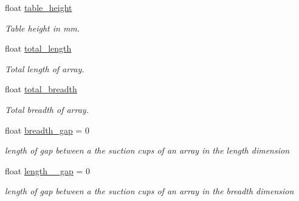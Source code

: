 \begin{DoxyCompactItemize}
\mbox{\label{classSuctionCupArray_a52078f120d8a964f00870e49253a5630}} 
float \hyperlink{classSuctionCupArray_a52078f120d8a964f00870e49253a5630}{table\+\_\+height}
\begin{DoxyCompactList}\small\item\em Table height in mm. \end{DoxyCompactList}\item 
\mbox{\label{classSuctionCupArray_aa9aedb708c91f8cccd83cdcf09437a44}} 
float \hyperlink{classSuctionCupArray_aa9aedb708c91f8cccd83cdcf09437a44}{total\+\_\+length}
\begin{DoxyCompactList}\small\item\em Total length of array. \end{DoxyCompactList}\item 
\mbox{\label{classSuctionCupArray_aa824e15826e6aa1f860475daec41e17e}} 
float \hyperlink{classSuctionCupArray_aa824e15826e6aa1f860475daec41e17e}{total\+\_\+breadth}
\begin{DoxyCompactList}\small\item\em Total breadth of array. \end{DoxyCompactList}\item 
\mbox{\label{classSuctionCupArray_abc9fedf81d8e05ce102a65773e070255}} 
float \hyperlink{classSuctionCupArray_abc9fedf81d8e05ce102a65773e070255}{breadth\+\_\+gap} = 0
\begin{DoxyCompactList}\small\item\em length of gap between a the suction cups of an array in the length dimension \end{DoxyCompactList}\item 
\mbox{\label{classSuctionCupArray_ad76a4968df08cd66ab4d3673869d7ee6}} 
float \hyperlink{classSuctionCupArray_ad76a4968df08cd66ab4d3673869d7ee6}{length\+\_\+\+\_\+gap} = 0
\begin{DoxyCompactList}\small\item\em length of gap between a the suction cups of an array in the breadth dimension \end{DoxyCompactList}\item 
\mbox{\label{classSuctionCupArray_ada1374d63871766ab0bd82306443b87c}} 

\end{DoxyCompactItemize}
